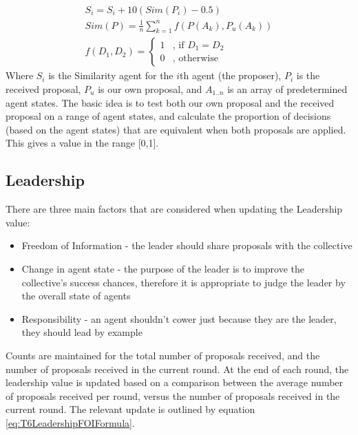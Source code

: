 \begin{equation}\label{eq:T6SimilarityFormula}
    \begin{aligned}
    S_{i}=S_{i}+10(Sim(P_{i})-0.5) \\
    Sim(P) = \frac{1}{n}\sum_{k=1}^{n}f(P(A_{k}),P_{u}(A_{k})) \\
    f(D_{1},D_{2})=\left\{
    	\begin{array}{ll}
    		1 & \mbox{, if } D_{1} = D_{2} \\
    		0 & \mbox{, otherwise} 
    	\end{array}\right.
    \end{aligned}
\end{equation}
Where $S_{i}$ is the Similarity agent for the $i$th agent (the proposer), $P_{i}$ is the received proposal, $P_{u}$ is our own proposal, and $A_{1..n}$ is an array of predetermined agent states. The basic idea is to test both our own proposal and the received proposal on a range of agent states, and calculate the proportion of decisions (based on the agent states) that are equivalent when both proposals are applied. This gives a value in the range [0,1].

\subsection{Leadership}

There are three main factors that are considered when updating the Leadership value:

\begin{itemize}
    \item Freedom of Information - the leader should share proposals with the collective
    \item Change in agent state - the purpose of the leader is to improve the collective's success chances, therefore it is appropriate to judge the leader by the overall state of agents
    \item Responsibility - an agent shouldn't cower just because they are the leader, they should lead by example
\end{itemize}

Counts are maintained for the total number of proposals received, and the number of proposals received in the current round. At the end of each round, the leadership value is updated based on a comparison between the average number of proposals received per round, versus the number of proposals received in the current round. The relevant update is outlined by equation \ref{eq:T6LeadershipFOIFormula}.

